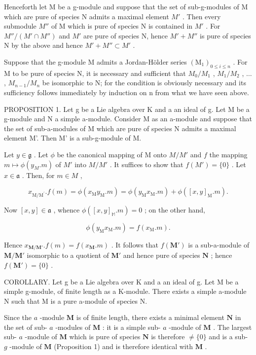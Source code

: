 Henceforth let M be a g-module and suppose that the set of sub-g-modules of M which are pure of species N admits a maximal element \(M'\) . Then every submodule \(M''\) of M which is pure of species N is contained in \(M'\) . For \(M''/(M' \cap M'')\) and \(M'\) are pure of species N, hence \(M' + M''\) is pure of species N by the above and hence \(M' + M'' \subset M'\) .

Suppose that the g-module M admits a Jordan-Hölder series \((\mathrm{M}_{1})_{0\leqslant i\leqslant n}\) . For M to be pure of species N, it is necessary and sufficient that \(M_{0}/M_{1}\) , \(M_{1}/M_{2}\) , \(\ldots\) , \(M_{n-1}/M_{n}\) be isomorphic to N; for the condition is obviously necessary and its sufficiency follows immediately by induction on n from what we have seen above.

PROPOSITION 1. Let g be a Lie algebra over K and a an ideal of g. Let M be a g-module and N a simple a-module. Consider M as an a-module and suppose that the set of sub-a-modules of M which are pure of species N admits a maximal element M'. Then M' is a sub-g-module of M.

Let \(y \in \mathfrak{g}\) . Let \(\phi\) be the canonical mapping of M onto \(M / M'\) and \(f\) the mapping \(m \mapsto \phi(y_M. m)\) of \(M'\) into \(M / M'\) . It suffices to show that \(f(M') = \{0\}\) . Let \(x \in \mathfrak{a}\) . Then, for \(m \in M\) ,

\[
x _ {\mathrm{M} / \mathrm{M} ^ {\prime}}. f (m) = \phi (x _ {\mathrm{M}} y _ {\mathrm{M}}. m) = \phi (y _ {\mathrm{M}} x _ {\mathrm{M}}. m) + \phi ([ x, y ] _ {\mathrm{M}}. m).
\]

Now \([x,y] \in \mathfrak{a}\) , whence \(\phi([x,y]_{\mathbb{M}}.m) = 0\) ; on the other hand,

\[
\phi (y _ {\mathrm{M}} x _ {\mathrm{M}}. m) = f (x _ {\mathrm{M}}. m).
\]

Hence \(x_{\mathbf{M} / \mathbf{M}'} . f(m) = f(x_{\mathbf{M}}.m)\) . It follows that \(f(\mathbf{M}')\) is a sub-a-module of \(\mathbf{M} / \mathbf{M}'\) isomorphic to a quotient of \(\mathbf{M}'\) and hence pure of species \(\mathbf{N}\) ; hence \(f(\mathbf{M}') = \{0\}\) .

COROLLARY. Let g be a Lie algebra over K and a an ideal of g. Let M be a simple g-module, of finite length as a K-module. There exists a simple a-module N such that M is a pure a-module of species N.

Since the \(a\) -module \(\mathbf{M}\) is of finite length, there exists a minimal element \(\mathbf{N}\) in the set of sub- \(a\) -modules of \(\mathbf{M}\) : it is a simple sub- \(a\) -module of \(\mathbf{M}\) . The largest sub- \(a\) -module of \(\mathbf{M}\) which is pure of species \(\mathbf{N}\) is therefore \(\neq \{0\}\) and is a sub- \(g\) -module of \(\mathbf{M}\) (Proposition 1) and is therefore identical with \(\mathbf{M}\) .

